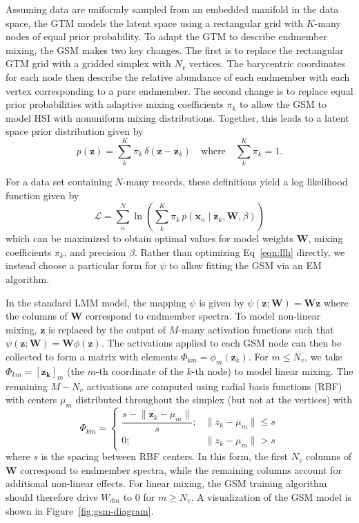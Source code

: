 Assuming data are uniformly sampled from an embedded manifold in the data space,
the GTM models the latent space using a rectangular grid with $K$-many nodes of
equal prior probability. To adapt the GTM to describe endmember mixing, the GSM
makes two key changes. The first is to replace the rectangular GTM grid with a
gridded simplex with $N_v$ vertices. The barycentric coordinates for each node
then describe the relative abundance of each endmember with each vertex
corresponding to a pure endmember. The second change is to replace equal prior
probabilities with adaptive mixing coefficients $\pi_k$ to allow the GSM to
model HSI with nonuniform mixing distributions. Together, this leads to a latent
space prior distribution given by
\begin{equation}\label{eqn:latent-distribution}
    p(\mathbf{z}) = \sum\limits_k^K \pi_k \, \delta(\mathbf{z} - \mathbf{z}_k) \quad\text{where}\quad  \sum_k^K\pi_k = 1.
\end{equation}

For a data set containing $N$-many records, these definitions yield a log
likelihood function given by
\begin{equation}\label{eqn:llh}
    \mathscr{L} = \sum\limits_n^N \ln \left( \sum\limits_k^K \pi_k \, p(\mathbf{x}_n \mid \mathbf{z}_k, \mathbf{W}, \beta) \right)
\end{equation}
which can be maximized to obtain optimal values for model weights $\mathbf{W}$,
mixing coefficients $\pi_k$, and precision $\beta$. Rather than optimizing
Eq~\ref{eqn:llh} directly, we instead choose a particular form for $\psi$ to
allow fitting the GSM via an EM algorithm.

In the standard LMM model, the mapping $\psi$ is given by
$\psi(\mathbf{z};\mathbf{W}) = \mathbf{W}\mathbf{z}$ where the columns
of $\mathbf{W}$ correspond to endmember spectra. To model non-linear mixing, $\mathbf{z}$
is replaced by the output of $M$-many activation functions such that $\psi(\mathbf{z};\mathbf{W})
= \mathbf{W}\phi(\mathbf{z})$. The activations applied to each GSM node can then be
collected to form a matrix with elements $\Phi_{km} = \phi_m(\mathbf{z}_k)$. For $m \leq
N_v$, we take $\Phi_{km} = [\mathbf{z_{k}}]_m$ (the $m$-th coordinate of the $k$-th node) to
model linear mixing. The remaining  $M-N_v$ activations are computed using
radial basis functions (RBF) with centers $\mu_m$
distributed throughout the simplex (but not at the vertices) with
\begin{equation}\label{eq:act-function}
    \Phi_{km} = \begin{cases}
        \dfrac{s - \lVert \mathbf{z}_k - \mu_m \rVert}{s}; & \lVert z_k - \mu_m \rVert \leq s \\
        0; & \lVert z_k - \mu_m \rVert > s
    \end{cases}
\end{equation}
where $s$ is the spacing between RBF centers. In this form, the first $N_v$
columns of $\mathbf{W}$ correspond to endmember spectra, while the remaining
columns account for additional non-linear effects. For linear mixing, the GSM
training algorithm should therefore drive $W_{dm}$ to $0$ for $m\geq N_v$. A
visualization of the GSM model is shown in Figure~\ref{fig:gsm-diagram}.


